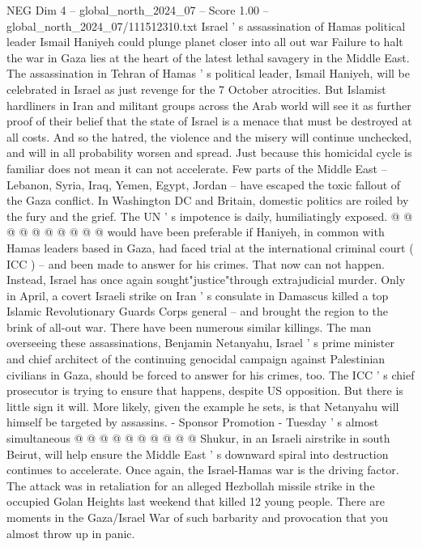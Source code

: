 \begin{textsample}{NEG Dim 4 – global\_north\_2024\_07 – Score 1.00 – global\_north\_2024\_07/111512310.txt}  \label{ex:f4_neg_288}
Israel ' s assassination of Hamas political leader Ismail Haniyeh could plunge planet closer into all out war Failure to halt the war in Gaza lies at the heart of the latest lethal savagery in the Middle East.
The assassination in Tehran of Hamas ' s political leader, Ismail Haniyeh, will be celebrated in Israel as just revenge for the 7 October atrocities.
But Islamist hardliners in Iran and militant groups across the Arab world will see it as further proof of their belief that the state of Israel is a menace that must be destroyed at all costs.
And so the hatred, the violence and the misery will continue unchecked, and will in all probability worsen and spread.
Just because this homicidal cycle is familiar does not mean it can not accelerate.
Few parts of the Middle East -- Lebanon, Syria, Iraq, Yemen, Egypt, Jordan -- have escaped the toxic fallout of the Gaza conflict.
In Washington DC and Britain, domestic politics are roiled by the fury and the grief.
The UN ' s impotence is daily, humiliatingly exposed. @ @ @ @ @ @ @ @ @ @ would have been preferable if Haniyeh, in common with Hamas leaders based in Gaza, had faced trial at the international criminal court ( ICC ) -- and been made to answer for his crimes.
That now can not happen.
Instead, Israel has once again sought"justice"through extrajudicial murder.
Only in April, a covert Israeli strike on Iran ' s consulate in Damascus killed a top Islamic Revolutionary Guards Corps general -- and brought the region to the brink of all-out war.
There have been numerous similar killings.
The man overseeing these assassinations, Benjamin Netanyahu, Israel ' s prime minister and chief architect of the continuing genocidal campaign against Palestinian civilians in Gaza, should be forced to answer for his crimes, too.
The ICC ' s chief prosecutor is trying to ensure that happens, despite US opposition.
But there is little sign it will.
More likely, given the example he sets, is that Netanyahu will himself be targeted by assassins. - Sponsor Promotion - Tuesday ' s almost simultaneous @ @ @ @ @ @ @ @ @ @ Shukur, in an Israeli airstrike in south Beirut, will help ensure the Middle East ' s downward spiral into destruction continues to accelerate.
Once again, the Israel-Hamas war is the driving factor.
The attack was in retaliation for an alleged Hezbollah missile strike in the occupied Golan Heights last weekend that killed 12 young people.
There are moments in the Gaza/Israel War of such barbarity and provocation that you almost throw up in panic.

\end{textsample}
